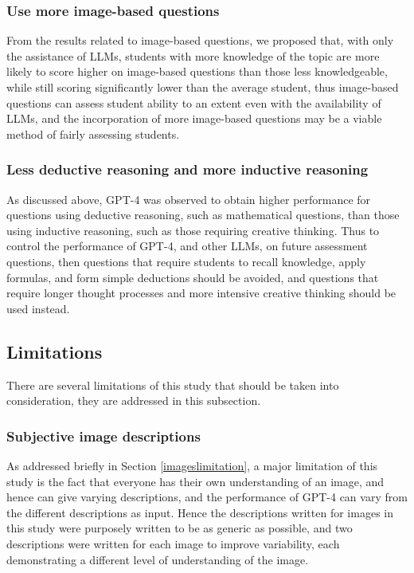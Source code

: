 \documentclass[sigconf,authordraft]{acmart}
\begin{document}
\subsubsection*{Use more image-based questions}
From the results related to image-based questions, we proposed that, with only the assistance of LLMs, students with more knowledge of the topic are more likely to score higher on image-based questions than those less knowledgeable, while still scoring significantly lower than the average student, thus image-based questions can assess student ability to an extent even with the availability of LLMs, and the incorporation of more image-based questions may be a viable method of fairly assessing students.

\subsubsection*{Less deductive reasoning and more inductive reasoning}
As discussed above, GPT-4 was observed to obtain higher performance for questions using deductive reasoning, such as mathematical questions, than those using inductive reasoning, such as those requiring creative thinking. Thus to control the performance of GPT-4, and other LLMs, on future assessment questions, then questions that require students to recall knowledge, apply formulas, and form simple deductions should be avoided, and questions that require longer thought processes and more intensive creative thinking should be used instead.

\subsection{Limitations}
There are several limitations of this study that should be taken into consideration, they are addressed in this subsection.

\subsubsection*{Subjective image descriptions}
As addressed briefly in Section \ref{imageslimitation}, a major limitation of this study is the fact that everyone has their own understanding of an image, and hence can give varying descriptions, and the performance of GPT-4 can vary from the different descriptions as input. Hence the descriptions written for images in this study were purposely written to be as generic as possible, and two descriptions were written for each image to improve variability, each demonstrating a different level of understanding of the image.
\end{document}
